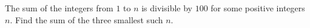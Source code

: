 The sum of the integers from $1$ to $n$ is divisible by $100$ for some positive integers $n$. Find the sum of the three smallest such $n$.
